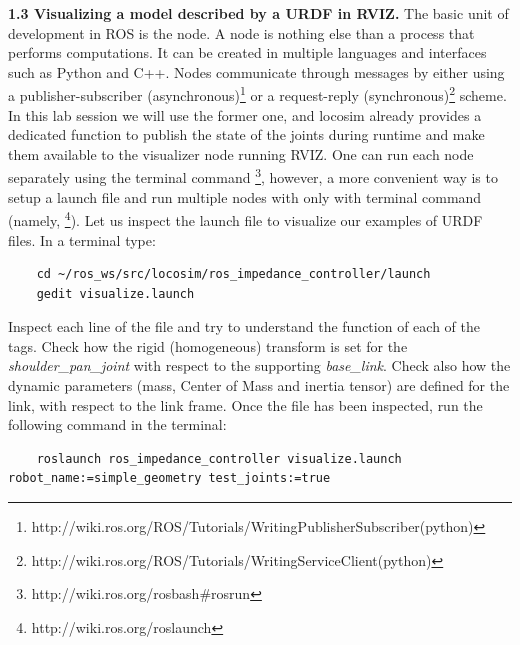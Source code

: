\documentclass[11pt]{article}
\begin{document}
\textbf{1.3 Visualizing a model described by a URDF in RVIZ.} The basic unit of development in ROS is the node. A node is nothing else than a process that performs computations. It can be created in multiple languages and interfaces such as Python and C++. Nodes communicate through messages by either using a publisher-subscriber (asynchronous)\footnote{http://wiki.ros.org/ROS/Tutorials/WritingPublisherSubscriber(python)} or a request-reply (synchronous)\footnote{http://wiki.ros.org/ROS/Tutorials/WritingServiceClient(python)} scheme. In this lab session we will use the former one, and locosim already provides a dedicated function to publish the state of the joints during runtime and make them available to the visualizer node running RVIZ. One can run each node separately using the terminal command \footnote{http://wiki.ros.org/rosbash\#rosrun}, however, a more convenient way is to setup a launch file and run multiple nodes with only with terminal command (namely, \footnote{http://wiki.ros.org/roslaunch}). Let us inspect the launch file to visualize our examples of URDF files. In a terminal type:
%
\begin{verbatim}
	cd ~/ros_ws/src/locosim/ros_impedance_controller/launch
	gedit visualize.launch
\end{verbatim}
%
Inspect each line of the file and try to understand the function of each 
of the tags. Check how the rigid (homogeneous) transform is set for the \textit{shoulder\_pan\_joint}  with respect to the supporting \textit{base\_link}. Check also how the dynamic parameters (mass, Center of Mass and inertia tensor) are defined for the link, with respect to the link frame. Once the file has been inspected,  run the following command in the terminal:

\footnotesize
\begin{verbatim}
	roslaunch ros_impedance_controller visualize.launch robot_name:=simple_geometry test_joints:=true
\end{verbatim}
\end{document}
